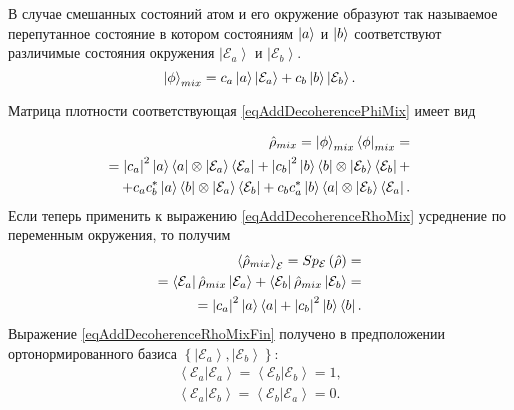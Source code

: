 В случае смешанных состояний атом и его окружение образуют так
называемое перепутанное состояние в котором состояниям
$\ket{a}$ и $\ket{b}$ соответствуют различимые 
состояния окружения $\left|\mathcal{E}_a\right>$ и
$\left|\mathcal{E}_b\right>$.
\begin{equation}
\left|\phi\right>_{mix} = c_a\ket{a} \left|\mathcal{E}_a\right>
+ c_b\ket{b} \left|\mathcal{E}_b\right>.
\label{eqAddDecoherencePhiMix}
\end{equation}

Матрица плотности 
соответствующая \eqref{eqAddDecoherencePhiMix} имеет вид

\begin{eqnarray}
\hat{\rho}_{mix} = \left|\phi\right>_{mix}\left<\phi\right|_{mix} = 
\nonumber \\
= 
\left|c_a\right|^2 \ket{a}\bra{a} \otimes
\left|\mathcal{E}_a\right>\left<\mathcal{E}_a\right| + 
\left|c_b\right|^2 \ket{b}\bra{b} \otimes
\left|\mathcal{E}_b\right>\left<\mathcal{E}_b\right| +
\nonumber \\
+
c_a c_b^{\ast}\ket{a}\bra{b} \otimes
\left|\mathcal{E}_a\right>\left<\mathcal{E}_b\right| +
c_b c_a^{\ast}\ket{b}\bra{a} \otimes
\left|\mathcal{E}_b\right>\left<\mathcal{E}_a\right|.
\label{eqAddDecoherenceRhoMix}
\end{eqnarray}
Если теперь применить к выражению \eqref{eqAddDecoherenceRhoMix}
усреднение по переменным окружения, то получим
\begin{eqnarray}
\left<\hat{\rho}_{mix}\right>_{\mathcal{E}} = 
Sp_{\mathcal{E}}\left(\hat{\rho}\right) = 
\nonumber \\
=
\left<\mathcal{E}_a\right|\hat{\rho}_{mix}\left|\mathcal{E}_a\right> +
\left<\mathcal{E}_b\right|\hat{\rho}_{mix}\left|\mathcal{E}_b\right>
= 
\nonumber \\
= \left|c_a\right|^2 \ket{a}\bra{a} + 
\left|c_b\right|^2 \ket{b}\bra{b}.
\label{eqAddDecoherenceRhoMixFin}
\end{eqnarray}
Выражение  \eqref{eqAddDecoherenceRhoMixFin} получено в предположении
ортонормированного базиса $\left\{\left|\mathcal{E}_a\right>,
\left|\mathcal{E}_b\right>\right\}$: 
\begin{eqnarray}
\left<\mathcal{E}_a\right.\left|\mathcal{E}_a\right> = 
\left<\mathcal{E}_b\right.\left|\mathcal{E}_b\right> = 1,
\nonumber \\
\left<\mathcal{E}_a\right.\left|\mathcal{E}_b\right> = 
\left<\mathcal{E}_b\right.\left|\mathcal{E}_a\right> = 0.
\label{eqAddDecoherenceMixECond}
\end{eqnarray}

